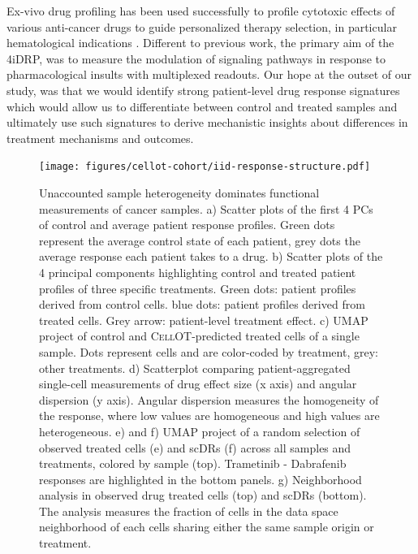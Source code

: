 Ex-vivo drug profiling has been used successfully to profile cytotoxic effects of various anti-cancer drugs to guide personalized therapy selection, in particular hematological indications \cite{liebers2023, kropivsek2023}.
Different to previous work, the primary aim of the 4iDRP, was to measure the modulation of signaling pathways in response to pharmacological insults with multiplexed readouts.
Our hope at the outset of our study, was that we would identify strong patient-level drug response signatures which would allow us to differentiate between control and treated samples and ultimately use such signatures to derive mechanistic insights about differences in treatment mechanisms and outcomes.  

\begin{figure}[htp!]
  \begin{center}
    \texttt{[image: figures/cellot-cohort/iid-response-structure.pdf]}
  \end{center}
  \caption{Unaccounted sample heterogeneity dominates functional measurements of cancer samples. a) Scatter plots of the first 4 PCs of control and average patient response profiles. Green dots represent the average control state of each patient, grey dots the average response each patient takes to a drug.
  b) Scatter plots of the 4 principal components highlighting control and treated patient profiles of three specific treatments. Green dots: patient profiles derived from control cells. blue dots: patient profiles derived from treated cells. Grey arrow: patient-level treatment effect.
  c) UMAP project of control and \textsc{CellOT}-predicted treated cells of a single sample. Dots represent cells and are color-coded by treatment, grey: other treatments.
  d) Scatterplot comparing patient-aggregated single-cell measurements of drug effect size (x axis) and angular dispersion (y axis). Angular dispersion measures the homogeneity of the response, where low values are homogeneous and high values are heterogeneous.
  e) and f) UMAP project of a random selection of observed treated cells (e) and scDRs (f) across all samples and treatments, colored by sample (top). Trametinib - Dabrafenib responses are highlighted in the bottom panels.
  g) Neighborhood analysis in observed drug treated cells (top) and scDRs (bottom). The analysis measures the fraction of cells in the data space neighborhood of each cells sharing either the same sample origin or treatment.
 }
  \label{fig:iid-structure}
\end{figure}

